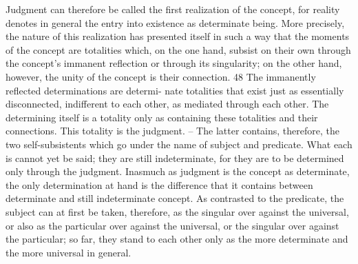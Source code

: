 Judgment can therefore be called the first realization of the concept,
for reality denotes in general the entry into existence as determinate being.
More precisely, the nature of this realization has presented itself in such
a way that the moments of the concept are totalities which, on the one
hand, subsist on their own through the concept's immanent reflection or
through its singularity; on the other hand, however, the unity of the concept
is their connection. 48 The immanently reflected determinations are determi-
nate totalities that exist just as essentially disconnected, indifferent to each
other, as mediated through each other. The determining itself is a totality
only as containing these totalities and their connections. This totality is the
judgment. – The latter contains, therefore, the two self-subsistents which
go under the name of subject and predicate. What each is cannot yet be said;
they are still indeterminate, for they are to be determined only through the
judgment. Inasmuch as judgment is the concept as determinate, the only
determination at hand is the difference that it contains between determinate
and still indeterminate concept. As contrasted to the predicate, the subject
can at first be taken, therefore, as the singular over against the universal, or
also as the particular over against the universal, or the singular over against
the particular; so far, they stand to each other only as the more determinate
and the more universal in general.

